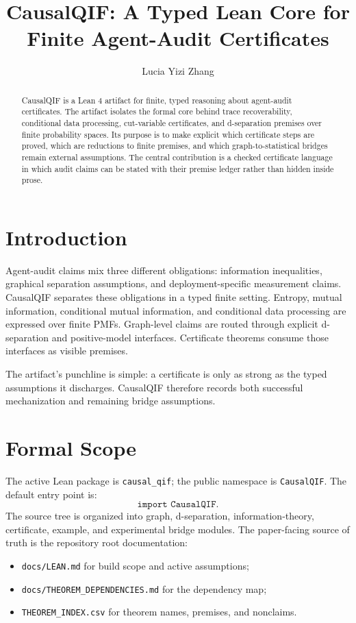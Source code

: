 \documentclass{article}
\title{CausalQIF: A Typed Lean Core for Finite Agent-Audit Certificates}
\author{Lucia Yizi Zhang}
\date{}
\begin{document}
\maketitle

\begin{abstract}
CausalQIF is a Lean 4 artifact for finite, typed reasoning about
agent-audit certificates.  The artifact isolates the formal core behind
trace recoverability, conditional data processing, cut-variable certificates,
and d-separation premises over finite probability spaces.  Its purpose is to
make explicit which certificate steps are proved, which are reductions to
finite premises, and which graph-to-statistical bridges remain external
assumptions.  The central contribution is a checked certificate language in
which audit claims can be stated with their premise ledger rather than hidden
inside prose.
\end{abstract}

\section{Introduction}

Agent-audit claims mix three different obligations: information inequalities,
graphical separation assumptions, and deployment-specific measurement claims.
CausalQIF separates these obligations in a typed finite setting.  Entropy,
mutual information, conditional mutual information, and conditional data
processing are expressed over finite PMFs.  Graph-level claims are routed
through explicit d-separation and positive-model interfaces.  Certificate
theorems consume those interfaces as visible premises.

The artifact's punchline is simple: a certificate is only as strong as the
typed assumptions it discharges.  CausalQIF therefore records both successful
mechanization and remaining bridge assumptions.

\section{Formal Scope}

The active Lean package is \texttt{causal\_qif}; the public namespace is
\texttt{CausalQIF}.  The default entry point is:
\[
  \texttt{import CausalQIF}.
\]
The source tree is organized into graph, d-separation, information-theory,
certificate, example, and experimental bridge modules.  The paper-facing source
of truth is the repository root documentation:
\begin{itemize}
  \item \texttt{docs/LEAN.md} for build scope and active assumptions;
  \item \texttt{docs/THEOREM\_DEPENDENCIES.md} for the dependency map;
  \item \texttt{THEOREM\_INDEX.csv} for theorem names, premises, and nonclaims.
\end{itemize}
\end{document}
